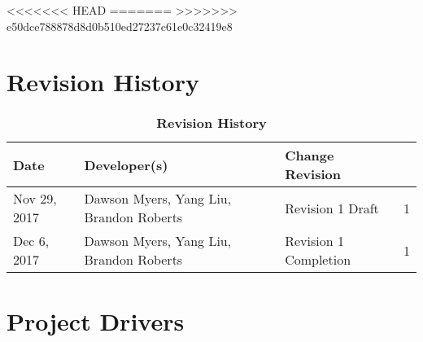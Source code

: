 \documentclass[12pt, titlepage]{article}
\newcommand{\revisionTable}{
	\begin{table}[hp]
		\caption{\bf Revision History}
		\begin{tabularx}{\textwidth}{lXlX}
		\toprule
		\textbf{Date} & \textbf{Developer(s)} & \textbf{Change}
		\textbf{Revision}\\
		\midrule
		Nov​ ​29,​ ​2017 & Dawson Myers, Yang Liu, Brandon Roberts & Revision​ ​1 Draft & 1\\
		\hline
		Dec 6,​ ​2017 & Dawson Myers, Yang Liu, Brandon Roberts & Revision​ ​1 Completion & 1\\
		\hline
		\bottomrule
		\end{tabularx}
	\end{table}
}
\begin{document}
	
	
	
	
	
	
	\def\thesection{\arabic{section}} 
	\renewcommand\thesection{\arabic{section}} 
	\renewcommand\thesubsection{\thesection.\arabic{subsection}}
	
	\tableofcontents
	
	\listoftables
	
<<<<<<< HEAD
=======
>>>>>>> e50dce788878d8d0b510ed27237c61e0c32419e8
	
	
	\newpage
	
	\section{Revision History}
	\revisionTable

	
	\section{Project Drivers}
\newcommand{\labelWidth}{55pt}
\newcommand{\descWidth}{5.13in}

	\newcommand{\pbox}[1]{\parbox[t]{\descWidth}{#1}}

	\newcommand{\labelbox}[1]{\parbox[t]{\labelWidth}{\textit{#1}}}
	\newcommand{\myline}{%
		\kern1pt %
		\hrule height 0.8pt
		\kern3pt %
	}
\end{document}
